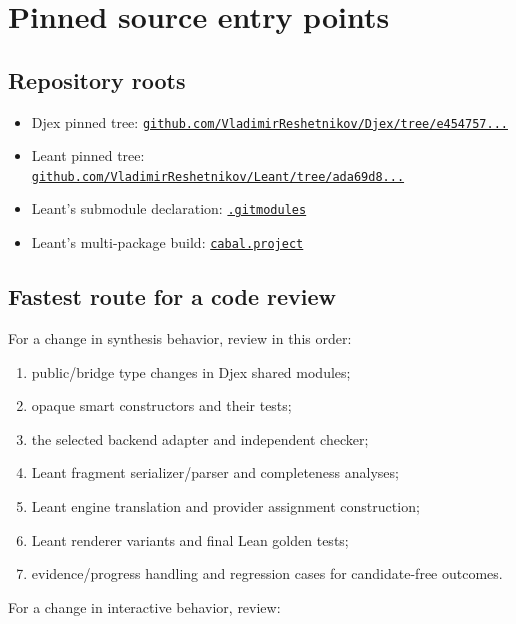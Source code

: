 \documentclass[10pt,letterpaper,oneside]{report}
\def\LeantBase{https://github.com/VladimirReshetnikov/Leant/blob/ada69d884480b93e74ee4b3daf77be38702ee07d/}
\newcommand{\lpath}[1]{\href{\LeantBase#1}{\nolinkurl{#1}}}
\begin{document}
\chapter{Pinned source entry points}\label{app:sources}

\section{Repository roots}

\begin{itemize}
  \item Djex pinned tree: \href{https://github.com/VladimirReshetnikov/Djex/tree/e454757d53ec057238c22fc6cd0d935b7d96b3dc}{\nolinkurl{github.com/VladimirReshetnikov/Djex/tree/e454757...}}
  \item Leant pinned tree: \href{https://github.com/VladimirReshetnikov/Leant/tree/ada69d884480b93e74ee4b3daf77be38702ee07d}{\nolinkurl{github.com/VladimirReshetnikov/Leant/tree/ada69d8...}}
  \item Leant's submodule declaration: \lpath{.gitmodules}
  \item Leant's multi-package build: \lpath{cabal.project}
\end{itemize}

\section{Fastest route for a code review}

For a change in synthesis behavior, review in this order:

\begin{enumerate}
  \item public/bridge type changes in Djex shared modules;
  \item opaque smart constructors and their tests;
  \item the selected backend adapter and independent checker;
  \item Leant fragment serializer/parser and completeness analyses;
  \item Leant engine translation and provider assignment construction;
  \item Leant renderer variants and final Lean golden tests;
  \item evidence/progress handling and regression cases for candidate-free outcomes.
\end{enumerate}

For a change in interactive behavior, review:
\end{document}
